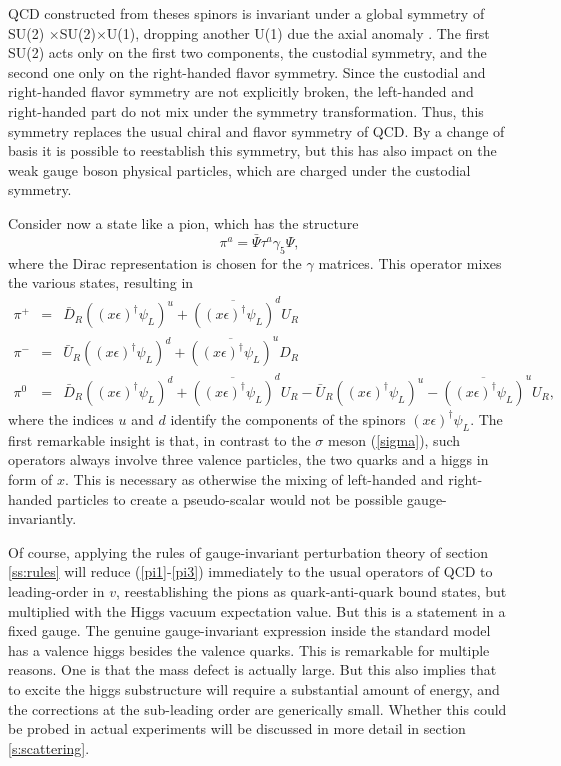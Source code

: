 \documentclass[final,12pt]{article}
\newcommand*{\no}{\noindent}
\newcommand*{\bea}{\begin{eqnarray}}
\newcommand*{\eea}{\end{eqnarray}}
\newcommand*{\be}{\begin{equation}}
\newcommand*{\ee}{\end{equation}}
\newcommand*{\pref}[1]{(\ref{#1})}
\newcommand*{\prefr}[2]{(\ref{#1}-\ref{#2})}
\newcommand*{\nn}{\nonumber}
\newcommand*{\1}{1\!\!\!\bot}
\begin{document}
QCD constructed from theses spinors is invariant under a global symmetry of SU(2) $\times $SU(2)$\times $U(1), dropping another U(1) due the axial anomaly \cite{Bohm:2001yx}. The first SU(2) acts only on the first two components, the custodial symmetry, and the second one only on the right-handed flavor symmetry. Since the custodial and right-handed flavor symmetry are not explicitly broken, the left-handed and right-handed part do not mix under the symmetry transformation. Thus, this symmetry replaces the usual chiral and flavor symmetry of QCD. By a change of basis it is possible to reestablish this symmetry, but this has also impact on the weak gauge boson physical particles, which are charged under the custodial symmetry.

Consider now a state like a pion, which has the structure
\be
\pi^a=\bar{\Psi}\tau^a\gamma_5\Psi\nn,
\ee
\no where the Dirac representation is chosen for the $\gamma$ matrices. This operator mixes the various states, resulting in
\bea
\pi^{+}&=&\bar{D}_R ((x\epsilon)^\dagger\psi_L)^u+\overline{((x\epsilon)^\dagger\psi_L)}^dU_R\label{pi1}\\
\pi^{-}&=&\bar{U}_R ((x\epsilon)^\dagger\psi_L)^d+\overline{((x\epsilon)^\dagger\psi_L)}^uD_R\\
\pi^0&=&\bar{D}_R ((x\epsilon)^\dagger\psi_L)^d+\overline{((x\epsilon)^\dagger\psi_L)}^dU_R-\bar{U}_R ((x\epsilon)^\dagger\psi_L)^u-\overline{((x\epsilon)^\dagger\psi_L)}^uU_R\label{pi3},
\eea
\no where the indices $u$ and $d$ identify the components of the spinors $(x\epsilon)^\dagger\psi_L$. The first remarkable insight is that, in contrast to the $\sigma$ meson \pref{sigma}, such operators always involve three valence particles, the two quarks and a higgs in form of $x$. This is necessary as otherwise the mixing of left-handed and right-handed particles to create a pseudo-scalar would not be possible gauge-invariantly.

Of course, applying the rules of gauge-invariant perturbation theory of section \ref{ss:rules} will reduce \prefr{pi1}{pi3} immediately to the usual operators of QCD to leading-order in $v$, reestablishing the pions as quark-anti-quark bound states, but multiplied with the Higgs vacuum expectation value. But this is a statement in a fixed gauge. The genuine gauge-invariant expression inside the standard model has a valence higgs besides the valence quarks. This is remarkable for multiple reasons. One is that the mass defect is actually large. But this also implies that to excite the higgs substructure will require a substantial amount of energy, and the corrections at the sub-leading order are generically small. Whether this could be probed in actual experiments will be discussed in more detail in section \ref{s:scattering}.
\end{document}
